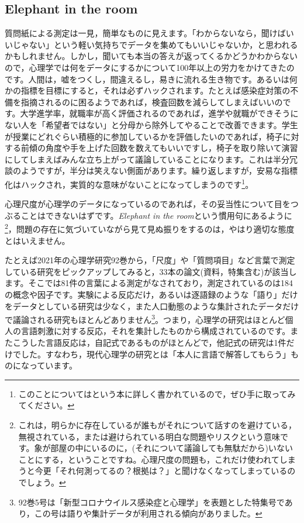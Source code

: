 \documentclass{ltjsbook}
\begin{document}
\subsection{Elephant in the room}
質問紙による測定は一見，簡単なものに見えます。「わからないなら，聞けばいいじゃない」という軽い気持ちでデータを集めてもいいじゃないか，と思われるかもしれません。しかし，聞いても本当の答えが返ってくるかどうかわからないので，心理学では何をデータにするかについて100年以上の労力をかけてきたのです。人間は，嘘をつくし，間違えるし，易きに流れる生き物です。あるいは何かの指標を目標にすると，それは必ずハックされます。たとえば感染症対策の不備を指摘されるのに困るようであれば，検査回数を減らしてしまえばいいのです。大学進学率，就職率が高く評価されるのであれば，進学や就職ができそうにない人を「希望者ではない」と分母から除外してやることで改善できます。学生が授業にどれぐらい積極的に参加しているかを評価したいのであれば，椅子に対する前傾の角度や手を上げた回数を数えてもいいですし，椅子を取り除いて演習にしてしまえばみんな立ち上がって議論していることになります。これは半分冗談のようですが，半分は笑えない側面があります。繰り返しますが，安易な指標化はハックされ，実質的な意味がないことになってしまうのです\footnote{このことについては\textcite{Jerry2019}という本に詳しく書かれているので，ぜひ手に取ってみてください。}。

心理尺度が心理学のデータになっているのであれば，その妥当性について目をつぶることはできないはずです。\textit{Elephant in the room}という慣用句にあるように\footnote{これは，明らかに存在しているが誰もがそれについて話すのを避けている，無視されている，または避けられている明白な問題やリスクという意味です。象が部屋の中にいるのに，(それについて議論しても無駄だから)いないことにする，ということですね。心理尺度の問題も，これだけ使われてしまうと今更「それ何測ってるの？根拠は？」と聞けなくなってしまっているのでしょう。}，問題の存在に気づいていながら見て見ぬ振りをするのは，やはり適切な態度とはいえません。

たとえば2021年の心理学研究92巻から，「尺度」や「質問項目」など言葉で測定している研究をピックアップしてみると，33本の論文(資料，特集含む)が該当します。そこでは81件の言葉による測定がなされており，測定されているのは184の概念や因子です。実験による反応だけ，あるいは逐語録のような「語り」だけをデータとしている研究は少なく，また人口動態のような集計されたデータだけで議論される研究もほとんどありません\footnote{92巻5号は「新型コロナウイルス感染症と心理学」を表題とした特集号であり，この号は語りや集計データが利用される傾向がありました。}。つまり，心理学の研究はほとんど個人の言語刺激に対する反応，それを集計したものから構成されているのです。またこうした言語反応は，自記式であるものがほとんどで，他記式の研究は1件\textcite{Nagatani202292}だけでした。すなわち，現代心理学の研究とは「本人に言語で解答してもらう」ものになっています。
\end{document}
